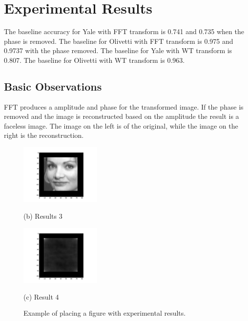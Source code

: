 \documentclass{article}
\begin{document}
\section{Experimental Results}
\label{sec:ExperimentalResults}

The baseline accuracy for Yale with FFT transform is 0.741 and 0.735 when the phase is removed. The baseline for Olivetti with FFT transform is 0.975 and 0.9737 with the phase removed. The baseline for Yale with WT transform is 0.807. The baseline for Olivetti with WT transform is 0.963.    

\subsection{Basic Observations}

FFT produces a amplitude and phase for the transformed image. If the phase is removed and the image is reconstructed based on the amplitude the result is a faceless image. The image on the left is of the original, while the image on the right is the reconstruction.   

\begin{figure}[htb]

\begin{minipage}[b]{.48\linewidth}
  \centering
  \centerline{\includegraphics[width=4.0cm]{recon/Original1o}}
  \centerline{(b) Results 3}\medskip
\end{minipage}
\hfill
\begin{minipage}[b]{0.48\linewidth}
  \centering
  \centerline{\includegraphics[width=4.0cm]{recon/Recon1o}}
  \centerline{(c) Result 4}\medskip
\end{minipage}
%
\caption{Example of placing a figure with experimental results.}
\label{fig:res}
%
\end{figure}
\end{document}
